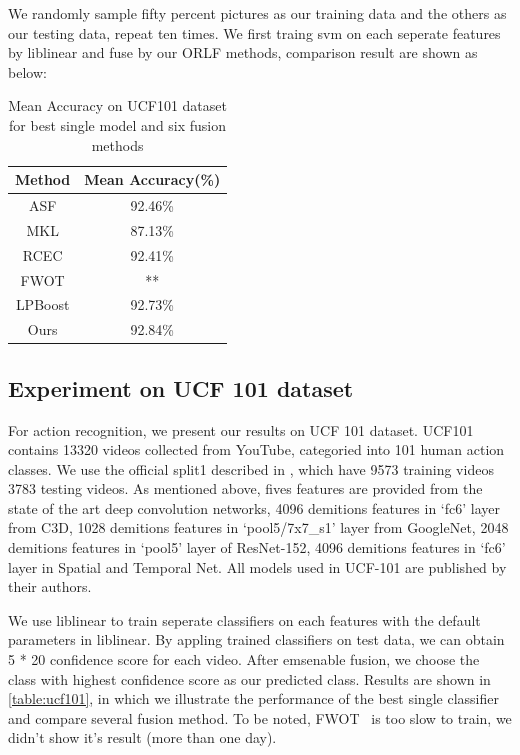 \documentclass[letterpaper]{article}
\begin{document}
We randomly sample fifty percent pictures as our training data and the others as our testing data, repeat ten times. We first traing svm on each seperate features by liblinear and fuse by our ORLF methods, comparison result are shown as below:

\begin{table}[h]\small
\centering
\label{table:oxford_pet}
\begin{tabular}{c|c}
\hline
Method                       & Mean Accuracy(\%) \\\hline
ASF                          & 92.46\%           \\
MKL                          & 87.13\%           \\
RCEC                         & 92.41\%           \\
FWOT                         & **                \\
LPBoost                      & 92.73\%           \\\hline
Ours                         & 92.84\%           \\
\hline
\end{tabular}
\caption{Mean Accuracy on UCF101 dataset for best single model and six fusion methods}
\end{table}


\subsection{Experiment on UCF 101 dataset}
For action recognition, we present our results on UCF 101 dataset\cite{soomro2012ucf101}. UCF101 contains 13320 videos collected from YouTube, categoried into 101 human action classes. We use the official split1 described in \cite{soomro2012ucf101}, which have 9573 training videos 3783 testing videos. As mentioned above, fives features are provided from the state of the art deep convolution networks, 4096 demitions features in `fc6' layer from C3D, 1028 demitions features in `pool5/7x7\_s1' layer from  GoogleNet, 2048 demitions features in `pool5' layer of ResNet-152, 4096 demitions features in `fc6' layer in Spatial and Temporal Net. All models used in UCF-101 are published by their authors.

We use liblinear to train seperate classifiers on each features with the default parameters in liblinear. By appling trained classifiers on test data, we can obtain 5 * 20 confidence score for each video. After emsenable fusion, we choose the class with highest confidence score as our predicted class. Results are shown in \ref{table:ucf101}, in which we illustrate the performance of the best single classifier and compare several fusion method. To be noted, FWOT~\cite{xuiccv2013feature} is too slow to train, we didn't show it's result (more than one day).
\end{document}

